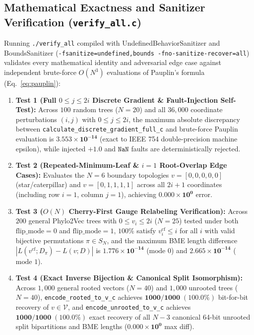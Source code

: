 \documentclass[11pt,a4paper]{article}
\theoremstyle{definition}
\begin{document}
\subsection{Mathematical Exactness and Sanitizer Verification (\texttt{verify\_all.c})}
Running \texttt{./verify\_all} compiled with UndefinedBehaviorSanitizer and BoundsSanitizer (\texttt{-fsanitize=undefined,bounds -fno-sanitize-recover=all}) validates every mathematical identity and adversarial edge case against independent brute-force $O(N^3)$ evaluations of Pauplin's formula (Eq.~\eqref{eq:pauplin}):
\begin{enumerate}
    \item \textbf{Test 1 (Full $0 \le j \le 2i$ Discrete Gradient \& Fault-Injection Self-Test):} Across $100$ random trees ($N = 20$) and all $36{,}000$ coordinate perturbations $(i, j)$ with $0 \le j \le 2i$, the maximum absolute discrepancy between \texttt{calculate\_discrete\_gradient\_full\_c} and brute-force Pauplin evaluation is $\mathbf{3.553 \times 10^{-14}}$ (exact to IEEE 754 double-precision machine epsilon), while injected $+1.0$ and $\texttt{NaN}$ faults are deterministically rejected.
    \item \textbf{Test 2 (Repeated-Minimum-Leaf \& $i=1$ Root-Overlap Edge Cases):} Evaluates the $N=6$ boundary topologies $v = [0, 0, 0, 0, 0]$ (star/caterpillar) and $v = [0, 1, 1, 1, 1]$ across all $2i+1$ coordinates (including row $i=1$, column $j=1$), achieving $\mathbf{0.000 \times 10^{0}}$ error.
    \item \textbf{Test 3 ($O(N)$ Cherry-First Gauge Relabeling Verification):} Across $200$ general Phylo2Vec trees with $0 \le v_i \le 2i$ ($N = 25$) tested under both $\text{flip\_mode} = 0$ and $\text{flip\_mode} = 1$, $100\%$ satisfy $v^{\text{cf}}_i \le i$ for all $i$ with valid bijective permutations $\pi \in S_N$, and the maximum BME length difference $|L(v^{\text{cf}}; D_\pi) - L(v; D)|$ is $\mathbf{1.776 \times 10^{-14}}$ ($\text{mode } 0$) and $\mathbf{2.665 \times 10^{-14}}$ ($\text{mode } 1$).
    \item \textbf{Test 4 (Exact Inverse Bijection \& Canonical Split Isomorphism):} Across $1{,}000$ general rooted vectors ($N = 40$) and $1{,}000$ unrooted trees ($N = 40$), \texttt{encode\_rooted\_to\_v\_c} achieves $\mathbf{1000 / 1000 \; (100.0\%)}$ bit-for-bit recovery of $v \in \mathcal{V}$, and \texttt{encode\_unrooted\_to\_v\_c} achieves $\mathbf{1000 / 1000 \; (100.0\%)}$ exact recovery of all $N-3$ canonical 64-bit unrooted split bipartitions and BME lengths ($\mathbf{0.000 \times 10^{0}}$ max diff).

\end{enumerate}
\end{document}
